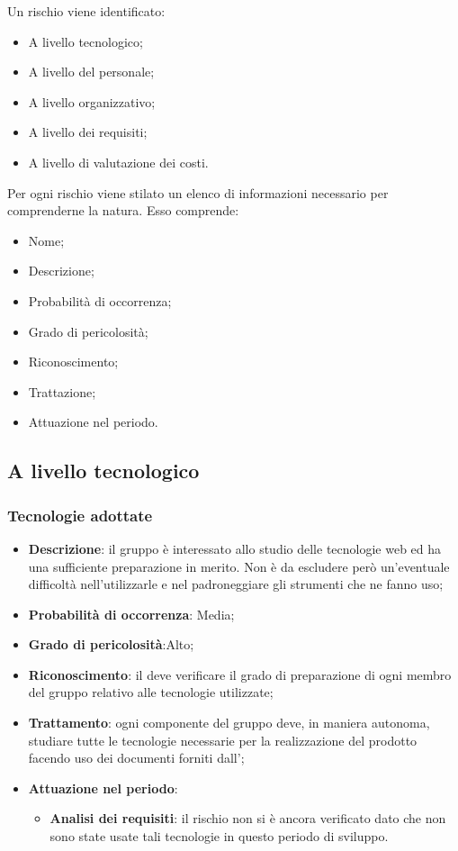 	Un rischio viene identificato: 
	
	\begin{itemize}
		\item A livello tecnologico; 
		\item A livello del personale;
		\item A livello organizzativo;
		\item A livello dei requisiti;
		\item A livello di valutazione dei costi.
	\end{itemize}
	
	Per ogni rischio viene stilato un elenco di informazioni necessario per comprenderne la natura. Esso comprende: 
	
	\begin{itemize}
		\item Nome; 
		\item Descrizione;
		\item Probabilità di occorrenza;
		\item Grado di pericolosità;
		\item Riconoscimento;
		\item Trattazione;
		\item Attuazione nel periodo.
	\end{itemize}

	\subsection{A livello tecnologico}
	
		\subsubsection{Tecnologie adottate}
		\begin{itemize}
			\item \textbf{Descrizione}: il gruppo è interessato allo studio delle tecnologie web ed ha una sufficiente preparazione in merito. Non è da escludere però un'eventuale difficoltà nell'utilizzarle e nel padroneggiare gli strumenti che ne fanno uso;
			\item \textbf{Probabilità di occorrenza}: Media;
			\item \textbf{Grado di pericolosità}:Alto;
			\item \textbf{Riconoscimento}: il \textit{\Res} deve verificare il grado di preparazione di ogni membro del gruppo relativo alle tecnologie utilizzate;	
			\item \textbf{Trattamento}: ogni componente del gruppo deve, in maniera autonoma, studiare tutte le tecnologie necessarie per la realizzazione del prodotto facendo uso dei documenti forniti dall'\textit{\Amm};
			\item \textbf{Attuazione nel periodo}:
				\begin{itemize}
					\item \textbf{Analisi dei requisiti}: il rischio non si è ancora verificato dato che non sono state usate tali tecnologie in questo periodo di sviluppo.
				\end{itemize}
		\end{itemize}
		
